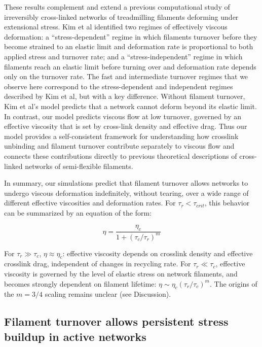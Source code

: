 These results complement and extend a previous computational study of irreversibly cross-linked networks of treadmilling filaments deforming under extensional stress\cite{Kim2014526}. Kim et al identified two regimes of effectively viscous deformation: a ``stress-dependent'' regime in which filaments turnover before they become strained to an elastic limit and deformation rate is proportional to both applied stress and turnover rate; and a ``stress-independent'' regime in which filaments reach an elastic limit before turning over and deformation rate depends only on the turnover rate. The fast and intermediate turnover regimes that we observe here correspond to the stress-dependent and independent regimes described by Kim et al, but with a key difference. Without filament turnover, Kim et al's model predicts that a network cannot deform beyond its elastic limit.  In contrast, our model predicts viscous flow at low turnover, governed by an effective viscosity that is set by cross-link density and effective drag. Thus our model provides a self-consistent framework for understanding how crosslink unbinding and filament turnover contribute separately to viscous flow and connects these contributions directly to previous theoretical descriptions of cross-linked networks of semi-flexible filaments. 

In summary, our simulations predict that filament turnover allows networks to undergo viscous deformation indefinitely, without tearing, over a wide range of different effective viscosities and deformation rates. For $\tau_r < \tau_{crit}$, this behavior can be summarized by an equation of the form:

\begin{equation}
	\label{eqn:simple_eta}
	\eta = \frac{\eta_c}{1+(\tau_c/\tau_r)^m}  
\end{equation}

For $\tau_r \gg \tau_c$, $\eta\approx\eta_c$: effective viscosity depends on crosslink density and effective crosslink drag, independent of changes in recycling rate. For $\tau_r\ll\tau_c$,  effective viscosity is governed by the level of elastic stress on network filaments, and becomes strongly dependent on filament lifetime: $\eta\sim\eta_c(\tau_r/\tau_c)^m$. The origins of the $m = 3/4$ scaling remains unclear (see Discussion).




\subsection*{Filament turnover allows persistent stress buildup in active networks}

